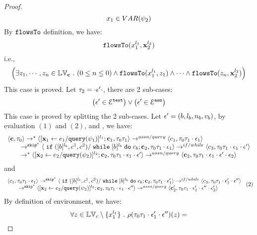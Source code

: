 \begin{proof}
\[  x_1 \in VAR(\psi_2)
\]
%
By $\mathtt{flowsTo}$ definition, we have:
%
\[
\mathtt{flowsTo}(x_1^{l_1}, {\boldsymbol{\mathbf{x}}}_2^{l_2})
\]
i.e.,
%
\[
 \Big( \exists z_1, \cdots, z_n \in \mathbb{LV}_{{\boldsymbol{\mathbf{c}}}} ~.~ (0 \leq n \leq 0 )
 \land \mathtt{flowsTo}(x_1^{l_1}, z_1) \land \cdots \land \mathtt{flowsTo}(z_n, {\boldsymbol{\mathbf{x}}}_2^{l_2}) \Big)
\]
%
This case is proved.
%
%
Let $\mathtt{\tau}_2 = \cdot \mathtt{\epsilon}' \cdot$, there are 2 sub-cases: 
%
 \[
 \big(\mathtt{\epsilon}' \in \mathcal{E}^{\mathtt{{test}}}\big) \lor \big(\mathtt{\epsilon}' \in \mathcal{E}^{\mathtt{{asn}}}\big)
 \]
%
This case is proved by splitting the 2 sub-cases.
%
Let $\mathtt{\epsilon}' = (b, l_b, n_b, v_b)$, by evaluation $(1)$ and $(2)$, and , we have:
\[
  \begin{array}{l}   
\langle {\boldsymbol{\mathbf{c}}}, \mathtt{\tau}_0 \rangle \rightarrow^{*} 
\langle [\mathrel{ {\boldsymbol{\mathbf{x}}}_1 \leftarrow e_1 / {\tt query}(\psi_1) }]^{l_1} ; {\boldsymbol{\mathbf{c}}}_1, \mathtt{\tau}_0 \mathtt{\tau}_1 \rangle  
\rightarrow^{assn/query}
 \langle c_1, \mathtt{\tau}_0 \mathtt{\tau}_1 \cdot \mathtt{\epsilon}_1 \rangle 
 \\
  \qquad \rightarrow^{\mathtt{skip}^*} 
  \langle \;\mathtt{if}\; ([b]^{l_b}, c^1, c^2) / \;\mathtt{while}\; [b]^{l_b} \;\mathtt{do}\; c_b;{\boldsymbol{\mathbf{c}}}_2, 
  \mathtt{\tau}_0 \mathtt{\tau}_1 \cdot \mathtt{\epsilon}_1 \rangle 
 \rightarrow^{if / while} 
  \langle c_3, 
  \mathtt{\tau}_0 \mathtt{\tau}_1 \cdot \mathtt{\epsilon}_1 \cdot \mathtt{\epsilon}' \rangle 
  \\
  \qquad   \rightarrow^{*} 
  \langle [\mathrel{ {\boldsymbol{\mathbf{x}}}_2 \leftarrow e_2 / {\tt query}(\psi_2) }]^{l_2};{\boldsymbol{\mathbf{c}}}_2, 
  \mathtt{\tau}_0 \mathtt{\tau}_1 \cdot \mathtt{\epsilon}_1 \cdot \mathtt{\epsilon}' \rangle 
  \rightarrow^{assn/query} 
  \langle {\boldsymbol{\mathbf{c}}}_2,  \mathtt{\tau}_0 \mathtt{\tau}_1 \cdot \mathtt{\epsilon}_1 \cdot \mathtt{\epsilon}' \cdot \mathtt{\epsilon}_2 \rangle 
\end{array}
 \]
 and 
  \[
  \begin{array}{l}   
  \langle c_1, \mathtt{\tau}_0 \mathtt{\tau}_1 \cdot \mathtt{\epsilon}_1 \rangle 
  \rightarrow^{\mathtt{skip}^*} 
  \langle \;\mathtt{if}\; ([b]^{l_b}, c^1, c^2) / \;\mathtt{while}\; [b]^{l_b} \;\mathtt{do}\; c_b;{\boldsymbol{\mathbf{c}}}_2, 
  \mathtt{\tau}_0 \mathtt{\tau}_1 \cdot \mathtt{\epsilon}_1' \rangle 
  \rightarrow^{if / while} 
  \langle c_3, 
  \mathtt{\tau}_0 \mathtt{\tau}_1 \cdot \mathtt{\epsilon}_1' \cdot \mathtt{\epsilon}'' \rangle 
  \\
  \qquad \rightarrow^{\mathtt{skip}^*} 
  \langle [\mathrel{ {\boldsymbol{\mathbf{x}}}_2 \leftarrow e_2 / {\tt query}(\psi_2) }]^{l_2};{\boldsymbol{\mathbf{c}}}_2, 
  \mathtt{\tau}_0 \mathtt{\tau}_1 \cdot \mathtt{\epsilon}_1\cdot \mathtt{\epsilon}'' \rangle 
  \rightarrow^{assn/query} 
  \langle {\boldsymbol{\mathbf{c}}}_2',  \mathtt{\tau}_0 \mathtt{\tau}_1 \cdot \mathtt{\epsilon}_1' \cdot \mathtt{\epsilon}'' \cdot \mathtt{\epsilon}_2' \rangle 
\end{array} ~(2)
 \]
%
By definition of environment, we have:
\[
  \forall z \in \mathbb{LV}_c \setminus \{x_1^{l_1}\} ~.~
  \rho(\mathtt{\tau}_0 \mathtt{\tau}_1 \cdot \mathtt{\epsilon}_1' \cdot \mathtt{\epsilon}'') (z) =  
\]
\end{proof}
